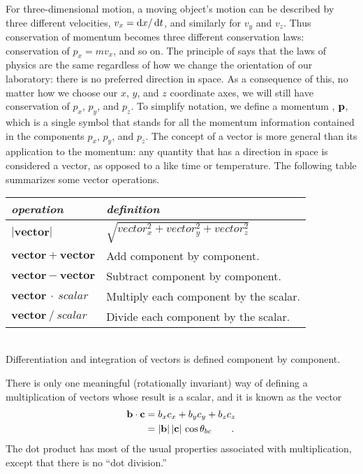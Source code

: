 	For three-dimensional motion, a moving object's motion can be described
	by three different velocities, $v_x=\operatorname{d\!} x/\operatorname{d\!} t$, and similarly for $v_y$ and $v_z$.
	Thus conservation of momentum becomes three different conservation laws:
	conservation of $p_x=mv_x$, and so on. The principle of 
	says that the laws of physics are the same regardless of how we change the
	orientation of our laboratory: there is no preferred direction in space.
	As a consequence of this, no matter how we choose our $x$, $y$, and
	$z$ coordinate axes, we will still have conservation of $p_x$, $p_y$, and
	$p_z$. To simplify notation, we define a momentum , $\mathbf{p}$, which
	is a single symbol that stands for all the momentum information
	contained in the components $p_x$, $p_y$, and $p_z$. The concept of a vector
	is more general than its application to the momentum: any quantity that has
	a direction in space is considered a vector, as opposed to a 
	like time or temperature. The following table summarizes some vector operations.\\
	\begin{tabular}{|l|p{65mm}|}
	\hline
	\textsl{operation}	& \textsl{definition} \\
	\hline
	$|\mathbf{vector}|$	& $\sqrt{vector_x^2+vector_y^2+vector_z^2}$ \\
	$\mathbf{vector}+\mathbf{vector}$	& Add component by component. \\
	$\mathbf{vector}-\mathbf{vector}$	& Subtract component by component. \\
	$\mathbf{vector}\ \cdot\ scalar	$	& Multiply each component by the scalar. \\
	$\mathbf{vector}\ /\ scalar	$	& Divide each component by the scalar. \\
	\hline
	\end{tabular}\\
	Differentiation and integration of vectors is defined component by component.
	
	There is only one meaningful (rotationally invariant)
	way of defining a multiplication of vectors
	whose result is a scalar, and it is known as the vector 
	\begin{align*}	
		\mathbf{b}\cdot\mathbf{c}	
			&=  b_{x} c_{x}+ b_y c_{y}+ b_{z} c_z \\
			&= |\mathbf{b}|\,|\mathbf{c}|\,\cos\theta_{bc} \qquad .
	\end{align*}
	The dot product has most of the usual properties associated with multiplication,
	except that there is no ``dot division.''


